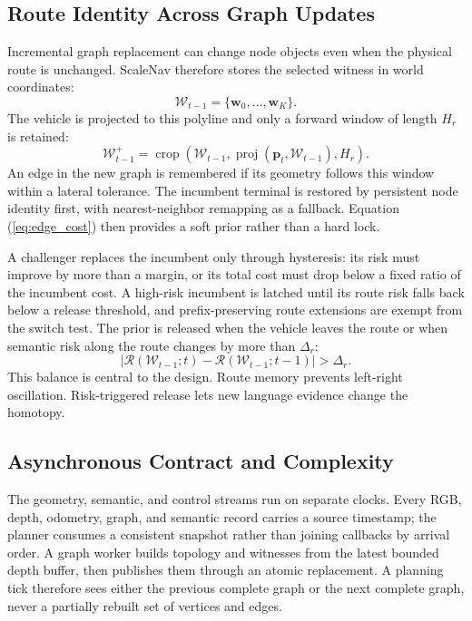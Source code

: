 \documentclass[letterpaper,10pt,conference]{ieeeconf}
\newcommand{\vect}[1]{\boldsymbol{#1}}
\begin{document}
\subsection{Route Identity Across Graph Updates}
Incremental graph replacement can change node objects even when the physical
route is unchanged.
ScaleNav therefore stores the selected witness in world coordinates:
\begin{equation}
 \mathcal{W}_{t-1}=\{\vect{w}_0,\ldots,\vect{w}_K\}.
\end{equation}
The vehicle is projected to this polyline and only a forward window of length
$H_r$ is retained:
\begin{equation}
 \mathcal{W}^{+}_{t-1}=
 \operatorname{crop}(\mathcal{W}_{t-1},
                     \operatorname{proj}(\vect{p}_t,\mathcal{W}_{t-1}),H_r).
\end{equation}
An edge in the new graph is remembered if its geometry follows this window
within a lateral tolerance.
The incumbent terminal is restored by persistent node identity first, with
nearest-neighbor remapping as a fallback.
Equation (\ref{eq:edge_cost}) then provides a soft prior rather than a hard
lock.

A challenger replaces the incumbent only through hysteresis: its risk must
improve by more than a margin, or its total cost must drop below a fixed
ratio of the incumbent cost.
A high-risk incumbent is latched until its route risk falls back below a
release threshold, and prefix-preserving route extensions are exempt from
the switch test.
The prior is released when the vehicle leaves the route or when semantic
risk along the route changes by more than $\Delta_r$:
\begin{equation}
 \left|\mathcal{R}(\mathcal{W}_{t-1};t)-
        \mathcal{R}(\mathcal{W}_{t-1};t-1)\right|>\Delta_r.
\end{equation}
This balance is central to the design.
Route memory prevents left-right oscillation.
Risk-triggered release lets new language evidence change the homotopy.

\subsection{Asynchronous Contract and Complexity}
The geometry, semantic, and control streams run on separate clocks.  Every
RGB, depth, odometry, graph, and semantic record carries a source timestamp;
the planner consumes a consistent snapshot rather than joining callbacks by
arrival order.  A graph worker builds topology and witnesses from the latest
bounded depth buffer, then publishes them through an atomic replacement.  A
planning tick therefore sees either the previous complete graph or the next
complete graph, never a partially rebuilt set of vertices and edges.
\end{document}

